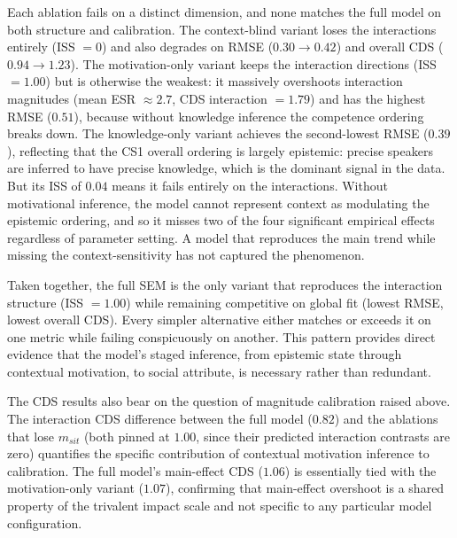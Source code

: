 \documentclass[12pt,a4paper]{article}
\begin{document}
Each ablation fails on a distinct dimension, and none matches the full model on
both structure and calibration. The context-blind variant loses the interactions
entirely (ISS $= 0$) and also degrades on RMSE ($0.30 \to 0.42$) and overall
CDS ($0.94 \to 1.23$). The motivation-only variant keeps the interaction
directions (ISS $= 1.00$) but is otherwise the weakest: it massively overshoots
interaction magnitudes (mean ESR $\approx 2.7$, CDS interaction $= 1.79$) and
has the highest RMSE ($0.51$), because without knowledge inference the competence
ordering breaks down. The knowledge-only variant achieves the second-lowest RMSE
($0.39$), reflecting that the CS1 overall ordering is largely epistemic: precise
speakers are inferred to have precise knowledge, which is the dominant signal in
the data. But its ISS of $0.04$ means it fails entirely on the interactions.
Without motivational inference, the model cannot represent context as modulating
the epistemic ordering, and so it misses two of the four significant empirical
effects regardless of parameter setting. A model that reproduces the main trend
while missing the context-sensitivity has not captured the phenomenon.

Taken together, the full SEM is the only variant that reproduces the interaction
structure (ISS $= 1.00$) while remaining competitive on global fit (lowest RMSE,
lowest overall CDS). Every simpler alternative either matches or exceeds it on
one metric while failing conspicuously on another. This pattern provides
direct evidence that the model's staged inference, from epistemic state through
contextual motivation, to social attribute, is necessary rather than redundant.

The CDS results also bear on the question of magnitude calibration raised
above. The interaction CDS difference between the full model ($0.82$) and the
ablations that lose $m_{sit}$ (both pinned at $1.00$, since their predicted
interaction contrasts are zero) quantifies the specific contribution of
contextual motivation inference to calibration. The full model's main-effect CDS
($1.06$) is essentially tied with the motivation-only variant ($1.07$),
confirming that main-effect overshoot is a shared property of the trivalent
impact scale and not specific to any particular model configuration.
\end{document}
